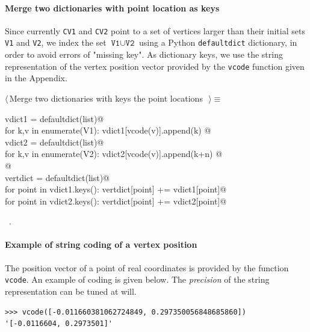 \documentclass[11pt,oneside]{article}	%
\begin{document}
\paragraph{Merge two dictionaries with point location as keys}
Since currently \texttt{CV1} and \texttt{CV2} point to a set of vertices larger than their initial sets 
\texttt{V1} and \texttt{V2}, we index the set $\texttt{V1} \cup \texttt{V2}$ using a Python \texttt{defaultdict} dictionary, in order to avoid errors of "missing key". As dictionary keys, we use the string representation of the vertex position vector provided by the \texttt{vcode} function given in the Appendix.
\begin{flushleft} \small \label{scrap5}
$\langle\,$Merge two dictionaries with keys the point locations\nobreak\ {\footnotesize {}}$\,\rangle\equiv$
\vspace{-1ex}
\begin{list}{}{} \item
\mbox{}\verb@   vdict1 = defaultdict(list)@\\
\mbox{}\verb@   for k,v in enumerate(V1): vdict1[vcode(v)].append(k) @\\
\mbox{}\verb@   vdict2 = defaultdict(list)@\\
\mbox{}\verb@   for k,v in enumerate(V2): vdict2[vcode(v)].append(k+n) @\\
\mbox{}\verb@   @\\
\mbox{}\verb@   vertdict = defaultdict(list)@\\
\mbox{}\verb@   for point in vdict1.keys(): vertdict[point] += vdict1[point]@\\
\mbox{}\verb@   for point in vdict2.keys(): vertdict[point] += vdict2[point]@\\
\mbox{}\verb@@{\NWsep}
\end{list}
\vspace{-1ex}
\footnotesize\addtolength{\baselineskip}{-1ex}
\begin{list}{}{\setlength{\itemsep}{-\parsep}\setlength{\itemindent}{-\leftmargin}}
\item \NWtxtMacroRefIn\ .
\end{list}
\end{flushleft}

\paragraph{Example of string coding of a vertex position}
The position vector of a point of real coordinates is provided by the function \texttt{vcode}.
An example of coding is given below. The \emph{precision} of the string representation can be tuned at will.
{\small
\begin{verbatim}
>>> vcode([-0.011660381062724849, 0.297350056848685860])
'[-0.0116604, 0.2973501]'
\end{verbatim}}
\end{document}
